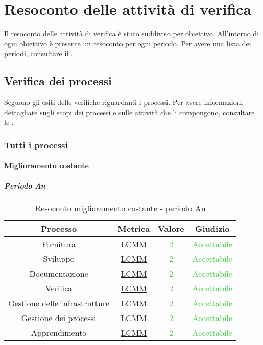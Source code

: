 \newpage

\section{Resoconto delle attività di verifica}
	Il resoconto delle attività di verifica è stato suddiviso per obiettivo. All'interno di ogni obiettivo è presente un resoconto per ogni periodo. Per avere una lista dei periodi, consultare il \pdpv.
	\subsection{Verifica dei processi}
		Seguono gli esiti delle verifiche riguardanti i processi. Per avere informazioni dettagliate sugli scopi dei processi e sulle attività che li compongono, consultare le \ndpv.
		\subsubsection{Tutti i processi}
			\paragraph{Miglioramento costante}
				\subparagraph{Periodo An}
		\begin{table}[H]
			\centering
			\small
			\begin{tabular}{c | c | c | c}
				\hline
				          \textbf{Processo}                 & \textbf{Metrica}                & \textbf{Valore}                            & \textbf{Giudizio}                           \\ \hline
				          Fornitura              & \hyperref[MMC]{LCMM}   & \textcolor{LimeGreen}{2}          & \textcolor{LimeGreen}{Accettabile} \\
				          Sviluppo                & \hyperref[MMC]{LCMM}   & \textcolor{LimeGreen}{2}          & \textcolor{LimeGreen}{Accettabile} \\
				       Documentazione            & \hyperref[MMC]{LCMM}   & \textcolor{LimeGreen}{2}          & \textcolor{LimeGreen}{Accettabile} \\
						   Verifica              & \hyperref[MMC]{LCMM}   & \textcolor{LimeGreen}{2}          & \textcolor{LimeGreen}{Accettabile} \\
				Gestione delle infrastrutture    & \hyperref[MMC]{LCMM}   & \textcolor{LimeGreen}{2}          & \textcolor{LimeGreen}{Accettabile} \\
				    Gestione dei processi        & \hyperref[MMC]{LCMM}   & \textcolor{LimeGreen}{2}          & \textcolor{LimeGreen}{Accettabile} \\
				        Apprendimento             & \hyperref[MMC]{LCMM}   & \textcolor{LimeGreen}{2}          & \textcolor{LimeGreen}{Accettabile} \\
				    \hline
			\end{tabular}
			\caption{Resoconto miglioramento costante - periodo An}
			\label{tab:resoconto_obiettivo_miglioramento_costante_AN}
		\end{table}
	
